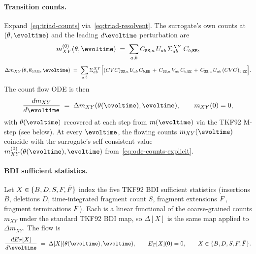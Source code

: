 \paragraph{Transition counts.}
Expand~\eqref{eq:triad-counts} via~\eqref{eq:triad-resolvent}.  The surrogate's
own counts at $(\theta,\evoltime)$ and the leading $d\evoltime$ perturbation are
\begin{equation}
\label{eq:ode-counts-explicit}
m^{(0)}_{XY}(\theta,\evoltime) \;=\;
\sum_{a,b}C_{\triadstart,a}\,U_{ab}\,\Sigma^{XY}_{ab}\,C_{b,\triadend},
\end{equation}
\begin{equation}
\label{eq:delta-m}
\Delta m_{XY}(\theta,\theta_\ggi,\evoltime) \;=\;
\sum_{a,b}\Sigma^{XY}_{ab}\Bigl[(CVC)_{\triadstart,a}\,U_{ab}\,C_{b,\triadend}
\,+\, C_{\triadstart,a}\,V_{ab}\,C_{b,\triadend}
\,+\, C_{\triadstart,a}\,U_{ab}\,(CVC)_{b,\triadend}\Bigr].
\end{equation}
The count flow ODE is then
\begin{equation}
\label{eq:ode-counts}
\frac{d m_{XY}}{d\evoltime} \;=\; \Delta m_{XY}(\theta(\evoltime),\evoltime),
\qquad m_{XY}(0)=0,
\end{equation}
with $\theta(\evoltime)$ recovered at each step from $m(\evoltime)$ via the
TKF92 M-step (see below).  At every $\evoltime$, the flowing counts
$m_{XY}(\evoltime)$ coincide with the surrogate's self-consistent value
$m^{(0)}_{XY}(\theta(\evoltime),\evoltime)$ from~\eqref{eq:ode-counts-explicit}.

\paragraph{BDI sufficient statistics.}
Let $X\in\{B,D,S,F,\bar F\}$ index the five TKF92 BDI
sufficient statistics (insertions $B$, deletions $D$, time-integrated
fragment count $S$, fragment extensions $F$, fragment terminations
$\bar F$).  Each is a linear functional of the coarse-grained counts
$m_{XY}$ under the standard TKF92 BDI map, so $\Delta[X]$ is the same map
applied to $\Delta m_{XY}$.  The flow is
\begin{equation}
\label{eq:ode-suffstats}
\frac{dE_T[X]}{d\evoltime} \;=\; \Delta[X](\theta(\evoltime),\evoltime),
\qquad E_T[X](0)=0,
\qquad X\in\{B,D,S,\nfragext,\nfragend\}.
\end{equation}


